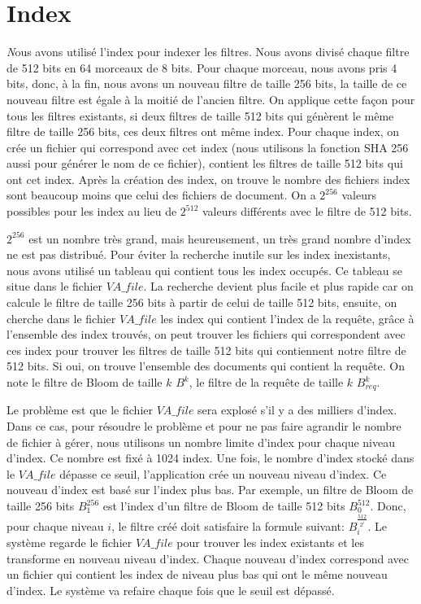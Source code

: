 \section{Index}
	{\huge \itshape N}ous avons utilisé l'index pour indexer les filtres. Nous avons divisé chaque filtre de 512 bits en 64 morceaux de 8 bits. Pour chaque morceau, nous avons pris 4 bits, donc, à la fin, nous avons un nouveau filtre de taille 256 bits, la taille de ce nouveau filtre est égale à la moitié de l'ancien filtre. On applique cette façon pour tous les filtres existants, si deux filtres de taille 512 bits qui génèrent le même filtre de taille 256 bits, ces deux filtres ont même index. Pour chaque index, on crée un fichier qui correspond avec cet index (\-nous utilisons la fonction SHA 256 aussi pour générer le nom de ce fichier), contient les filtres de taille 512 bits qui ont cet index. Après la création des index, on trouve le nombre des fichiers index sont beaucoup moins que celui des fichiers de document. On a $2^{256}$ valeurs possibles pour les index au lieu de $2^{512}$ valeurs différents avec le filtre de 512 bits.
	
	$2^{256}$ est un nombre très grand, mais heureusement, un très grand nombre d'index ne est pas distribué. Pour éviter la recherche inutile sur les index inexistants, nous avons utilisé un tableau qui contient tous les index occupés. Ce tableau se situe dans le fichier $VA\_file$. La recherche devient plus facile et plus rapide car on calcule le filtre de taille 256 bits à partir de celui de taille 512 bits, ensuite, on cherche dans le fichier $VA\_file$ les index qui contient l'index de la requête, grâce à l'ensemble des index trouvés, on peut trouver les fichiers qui correspondent avec ces index pour trouver les filtres de taille 512 bits qui contiennent notre filtre de 512 bits. Si oui, on trouve l'ensemble des documents qui contient la requête. On note le filtre de Bloom de taille $k$ $B^k$, le filtre de la requête de taille $k$ $B^{k}_{req}$.
	
	Le problème est que le fichier $VA\_file$ sera explosé s'il y a des milliers d'index. Dans ce cas, pour résoudre le problème et pour ne pas faire agrandir le nombre de fichier à gérer, nous utilisons un nombre limite d'index pour chaque niveau d'index. Ce nombre est fixé à 1024 index. Une fois, le nombre d'index stocké dans le $VA\_file$ dépasse ce seuil, l'application crée un nouveau niveau d'index. Ce nouveau d'index est basé sur l'index plus bas. Par exemple, un filtre de Bloom de taille 256 bits $B^{256}_1$ est l'index d'un filtre de Bloom de taille 512 bits $B^{512}_0$. Donc, pour chaque niveau $i$, le filtre créé doit satisfaire la formule suivant: $B^{\frac{512}{2^i}}_i$. Le système regarde le fichier $VA\_file$ pour trouver les index existants et les transforme en nouveau niveau d'index. Chaque nouveau d'index correspond avec un fichier qui contient les index de niveau plus bas qui ont le même nouveau d'index. Le système va refaire chaque fois que le seuil est dépassé.
	
